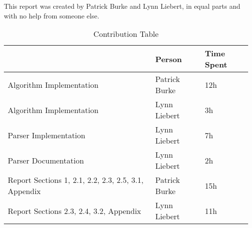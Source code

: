 This report was created by Patrick Burke and Lynn Liebert, in equal parts and with no help from someone else.

\vspace{2cm}
\vspace{2cm}

\vspace{7cm}

\begin{table}[H]
\centering
\caption*{Contribution Table}
\begin{tabular}{|p{5cm}|l|l|}
\hline
                         & Person        & Time Spent \\ \hline
Algorithm Implementation & Patrick Burke & 12h        \\ \hline
Algorithm Implementation & Lynn Liebert  & 3h         \\ \hline
Parser Implementation    & Lynn Liebert  & 7h         \\ \hline
Parser Documentation     & Lynn Liebert  & 2h         \\ \hline
Report Sections 1, 2.1,
2.2, 2.3, 2.5, 3.1,
Appendix                 & Patrick Burke & 15h        \\ \hline
Report Sections 2.3,
2.4, 3.2, Appendix       & Lynn Liebert  & 11h        \\ \hline

\end{tabular}
\end{table}

